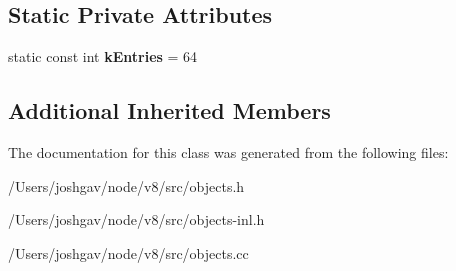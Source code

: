\subsection*{Static Private Attributes}
\begin{DoxyCompactItemize}
\item 
static const int {\bfseries k\+Entries} = 64\hypertarget{classv8_1_1internal_1_1_normalized_map_cache_a828752080843da57db9c701281d62689}{}\label{classv8_1_1internal_1_1_normalized_map_cache_a828752080843da57db9c701281d62689}

\end{DoxyCompactItemize}
\subsection*{Additional Inherited Members}


The documentation for this class was generated from the following files\+:\begin{DoxyCompactItemize}
\item 
/\+Users/joshgav/node/v8/src/objects.\+h\item 
/\+Users/joshgav/node/v8/src/objects-\/inl.\+h\item 
/\+Users/joshgav/node/v8/src/objects.\+cc\end{DoxyCompactItemize}
